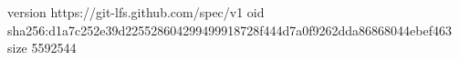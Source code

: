 version https://git-lfs.github.com/spec/v1
oid sha256:d1a7c252e39d225528604299499918728f444d7a0f9262dda86868044ebef463
size 5592544
